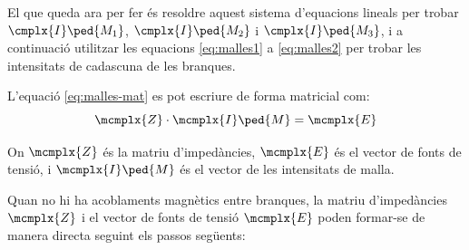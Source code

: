 El que queda ara per fer és resoldre aquest sistema d'equacions lineals per trobar $\cmplx{I}\ped{M_1}$, $\cmplx{I}\ped{M_2}$ i $\cmplx{I}\ped{M_3}$, i a continuació utilitzar les equacions \eqref{eq:malles1} a \eqref{eq:malles2} per trobar les intensitats de cadascuna de les branques.

L'equació \eqref{eq:malles-mat} es pot escriure de forma matricial com:
\begin{equation}
  \mcmplx{Z} \cdot\mcmplx{I}\ped{M} = \mcmplx{E}
\end{equation}

On  $\mcmplx{Z}$ és la matriu d'impedàncies, $\mcmplx{E}$ és el vector de fonts de tensió, i $\mcmplx{I}\ped{M}$ és el vector de les intensitats de malla.

 Quan no hi ha acoblaments magnètics entre branques, la matriu d'impedàncies $\mcmplx{Z}$ i el vector de fonts de tensió $\mcmplx{E}$ poden formar-se de manera directa seguint els passos següents:
